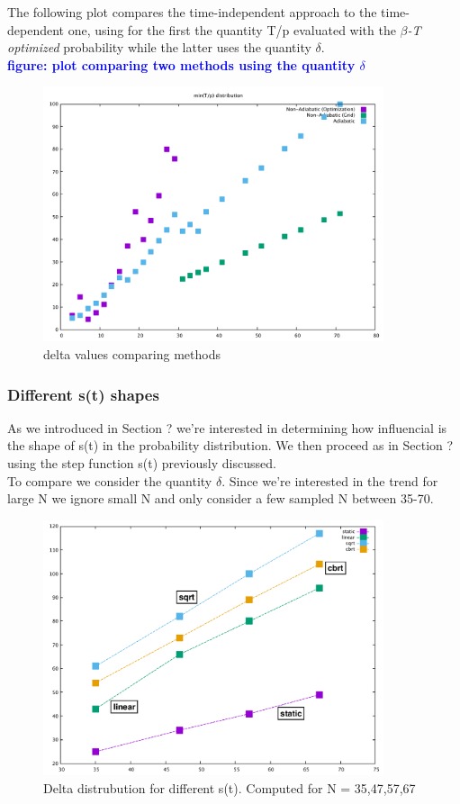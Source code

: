 \documentclass[aps,pra,reprint, onecolumn, showkeys]{revtex4-2}
\newcommand{\blue}[1]{\textcolor{blue}{\textbf{figure: #1}}}
\begin{document}
The following plot compares the time-independent approach to the time-dependent one, using for the first the quantity T/p evaluated with the \textit{$\beta$-T optimized} probability while the latter uses the quantity $\delta$. \\
\blue{plot comparing two methods using the quantity $\delta$}

\begin{figure}[ht]
\includegraphics[width=10cm]{./figures/delta.pdf}%
\caption{delta values comparing methods}
\end{figure}


\subsubsection{Different s(t) shapes}
As we introduced in Section ? we're interested in determining how influencial is the shape of s(t) in the probability distribution. We then proceed as in Section ? using the step function s(t) previously discussed. \\ To compare we consider the quantity $\delta$. Since we're interested in the trend for large N we ignore small N and only consider a few sampled N between 35-70.

\begin{figure}[ht]
\includegraphics[width=10cm]{./figures/9_Giugno.pdf}
\caption{Delta distrubution for different s(t). Computed for N = 35,47,57,67}
\end{figure}
\end{document}
